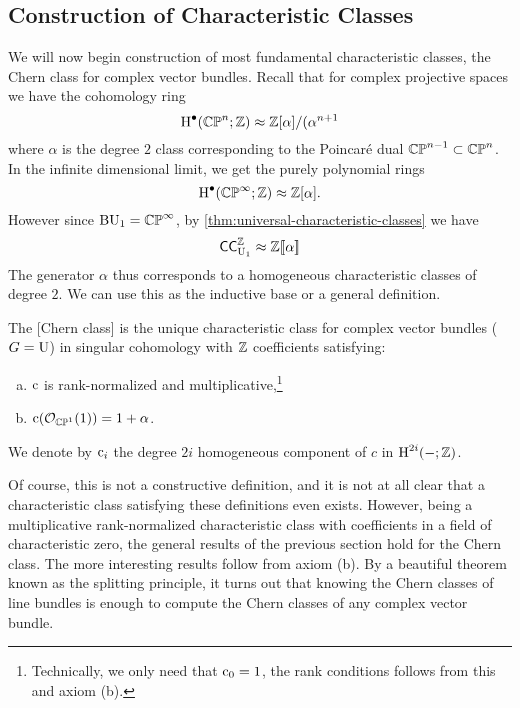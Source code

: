 \subsection{Construction of Characteristic Classes}

We will now begin construction of most fundamental characteristic classes, the Chern class for complex vector bundles. Recall that for complex projective spaces we have the cohomology ring
\[
	\operatorname{H}^\bullet(\mathbb{CP}^n;\mathbb{Z})\approx \mathbb{Z}[\alpha]/(\alpha^{n+1}
\]
where $\alpha$ is the degree $2$ class corresponding to the Poincar\'e dual $\mathbb{CP}^{n-1}\subset \mathbb{CP}^n$.
In the infinite dimensional limit, we get the purely polynomial rings
\[
		\operatorname{H}^\bullet(\mathbb{CP}^\infty;\mathbb{Z})\approx \mathbb{Z}[\alpha].
\]
However since $\mathrm{BU}_1=\mathbb{CP}^\infty$, by \cref{thm:universal-characteristic-classes} we have
\begin{equation}\label{eq:cczu1-a}
	\mathsf{CC}_{\mathrm{U}_1}^{\mathbb{Z}}\approx \mathbb{Z}[\![\alpha]\!]
\end{equation}
The generator $\alpha$ thus corresponds to a homogeneous characteristic classes of degree $2$. We can use this as the inductive base or a general definition.

\begin{definition}
	The [Chern class] is the unique characteristic class for complex vector bundles ($G=\mathrm{U}$) in singular cohomology with $\mathbb{Z}$ coefficients satisfying:
	\begin{enumerate}[(a)]
		\item $\mathrm{c}$ is rank-normalized and multiplicative,\footnote{Technically, we only need that $\mathrm{c}_0=1$, the rank conditions follows from this and axiom (b).}
		\item $\mathrm{c}(\mathcal{O}_{\mathbb{CP}^1}(1))=1+\alpha$.
	\end{enumerate}
	We denote by $\mathrm{c}_i$ the degree $2i$ homogeneous component of $c$ in $\operatorname{H}^{2i}(-;\mathbb{Z})$.
\end{definition}

Of course, this is not a constructive definition, and it is not at all clear that a characteristic class satisfying these definitions even exists.
However, being a multiplicative rank-normalized characteristic class with coefficients in a field of characteristic zero, the general results of the previous section hold for the Chern class. The more interesting results follow from axiom (b). By a beautiful theorem known as the splitting principle, it turns out that knowing the Chern classes of line bundles is enough to compute the Chern classes of any complex vector bundle.

